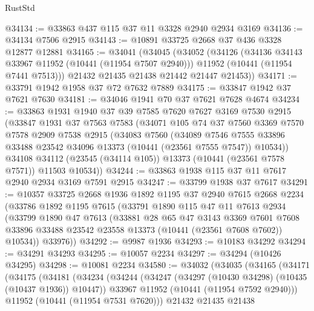 \begin{lexlean}{RustStd}
\begin{coremodule}
@34134 := @33863 @437 @115 @37 @11 @3328 @2940 @2934 @3169
@34136 := @34134 @7506 @2915
@34143 := @10891 @33725 @2668 @37 @436 @3328 @12877 @12881
@34165 := @34041
    (@34045
      (@34052
        (@34126
          (@34136 @34143 @33967 @11952 (@10441 (@11954 @7507 @2940)))
          @11952
          (@10441 (@11954 @7441 @7513)))
        @21432
        @21435
        @21438
        @21442
        @21447
        @21453))
@34171 := @33791 @1942 @1958 @37 @72 @7632 @7889
@34175 := @33847 @1942 @37 @7621 @7630
@34181 := @34046 @1941 @70 @37 @7621 @7628 @4674
@34234 := @33863
    @1931
    @1940
    @37
    @39
    @7585
    @7620
    @7627
    @3169
    @7530
    @2915
    (@33847
      @1931
      @37
      @7563
      @7583
      (@34071
        @105
        @74
        @37
        @7560
        @3369
        @7570
        @7578
        @2909
        @7538
        @2915
        (@34083
          @7560
          (@34089
            @7546
            @7555
            @33896
            @33488
            @23542
            @34096
            @13373
            (@10441 (@23561 @7555 @7547))
            @10534))
        @34108
        @34112
        (@23545 (@34114 @105))
        @13373
        (@10441 (@23561 @7578 @7571))
        @11503
        @10534))
@34244 := @33863 @1938 @115 @37 @11 @7617 @2940 @2934 @3169 @7591 @2915
@34247 := @33799 @1938 @37 @7617
@34291 := @10357
    @33725
    @2668
    @1936
    @1892
    @1195
    @37
    @2940
    @7615
    @2668
    @2234
    (@33786
      @1892
      @1195
      @7615
      (@33791
        @1890
        @115
        @47
        @11
        @7613
        @2934
        (@33799
          @1890
          @47
          @7613
          (@33881
            @28
            @65
            @47
            @3143
            @3369
            @7601
            @7608
            @33896
            @33488
            @23542
            @23558
            @13373
            (@10441 (@23561 @7608 @7602))
            @10534))
        @33976))
@34292 := @9987 @1936
@34293 := @10183 @34292
@34294 := @34291 @34293
@34295 := @10057 @2234
@34297 := @34294 (@10426 @34295)
@34298 := @10081 @2234
@34580 := @34032
    (@34035
      (@34165
        (@34171
          (@34175
            (@34181
              (@34234
                (@34244
                  (@34247 (@34297 (@10430 @34298) (@10435 (@10437 @1936)) @10447))
                  @33967
                  @11952
                  (@10441 (@11954 @7592 @2940)))
                @11952
                (@10441 (@11954 @7531 @7620)))
              @21432
              @21435
              @21438

\end{coremodule}
\end{lexlean}

